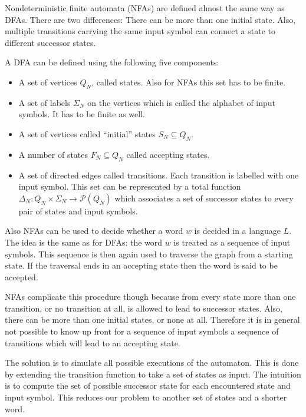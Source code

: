 Nondeterministic finite automata (NFAs) are defined almost the same way as DFAs.
There are two differences: There can be more than one initial state.
Also, multiple transitions carrying the same input symbol can connect a state to different
successor states.

\begin{definition}
    A DFA can be defined using the following five components:

    \begin{itemize}
        \item A set of vertices $Q_N$, called states.
        Also for NFAs this set has to be finite.
        \item A set of labels $\Sigma_N$ on the vertices which is called the alphabet of input symbols.
        It has to be finite as well.
        \item A set of vertices called ``initial'' states $S_N \subseteq Q_N$.
        \item A number of states $F_N \subseteq Q_N$ called accepting states.
        \item A set of directed edges called transitions.
        Each transition is labelled with one input symbol.
        This set can be represented by a total function
        $\Delta_N : Q_N \times \Sigma_N \rightarrow \mathcal{P}(Q_N)$ which
        associates a set of successor states to every pair of states and input symbols.
    \end{itemize}
\end{definition}

Also NFAs can be used to decide whether a word $w$ is decided in a language $L$.
The idea is the same as for DFAs: the word $w$ is treated as a sequence of input symbols.
This sequence is then again used to traverse the graph from a starting state.
If the traversal ends in an accepting state then the word is said to be accepted.

NFAs complicate this procedure though because from every state more than one
transition, or no transition at all, is allowed to lead to successor states.
Also, there can be more than one initial states, or none at all.
Therefore it is in general not possible to know up front for a sequence of input symbols
a sequence of transitions which will lead to an accepting state.

The solution is to simulate all possible executions of the automaton.
This is done by extending the transition function to take a set of states as input.
The intuition is to compute the set of possible successor state for each encountered state and input symbol.
This reduces our problem to another set of states and a shorter word.

